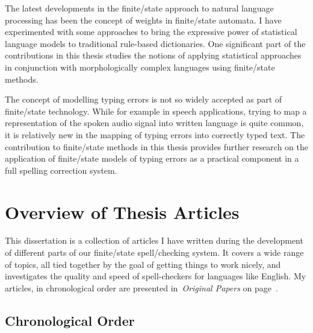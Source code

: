 \documentclass[officiallayout,final]{unihelcompling}
\begin{document}
The latest developments in the finite\-/state approach to natural language
processing has been the concept of weights in finite\-/state automata.  I have
experimented with some approaches to bring the expressive power of
statistical language models to traditional rule-based dictionaries. One
significant part of the contributions in this thesis studies the notions of
applying statistical approaches in conjunction with morphologically complex
languages using finite\-/state methods.

The concept of modelling typing errors is not so widely accepted as part of
finite\-/state technology. While for example in speech applications, trying to
map a representation of the spoken audio signal into written language is quite
common, it is relatively new in the mapping of typing errors into correctly
typed text. The contribution to finite\-/state methods in this thesis provides
further research on the application of finite\-/state models of typing errors
as a practical component in a full spelling correction system.

\section{Overview of Thesis Articles}
\label{sec:articles}

This dissertation is a collection of articles I have written during the
development of different parts of our finite\-/state spell\-/checking system. It
covers a wide range of topics, all tied together by the goal of getting things
to work nicely, and investigates the quality and speed of spell-checkers
for languages like English. My articles, in chronological order are presented
in~\emph{Original Papers} on page~\pageref{chap:papers}.

\subsection{Chronological Order}
\label{subsec:chronological}
\end{document}
